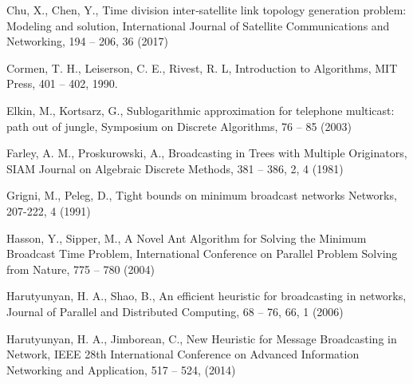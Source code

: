 






\begin{thebibliography}{}
%
%
Chu, X., Chen, Y.,
Time division inter‐satellite link topology generation problem: Modeling and solution,
International Journal of Satellite Communications and Networking, 194 -- 206, 36 (2017)

Cormen, T. H., Leiserson, C. E., Rivest, R. L,
Introduction to Algorithms, 
MIT Press, 401 -- 402, 1990. 

Elkin, M., Kortsarz, G.,
Sublogarithmic approximation for telephone multicast: path out of jungle,
Symposium on Discrete Algorithms, 76 -- 85 (2003)

Farley, A. M., Proskurowski, A.,
Broadcasting in Trees with Multiple Originators,
SIAM Journal on Algebraic Discrete Methods, 381 -- 386, 2, 4 (1981)

Grigni, M., Peleg, D.,
Tight bounds on minimum broadcast networks
Networks, 207-222, 4 (1991)

Hasson, Y., Sipper, M.,
A Novel Ant Algorithm for Solving the Minimum Broadcast Time Problem,
International Conference on Parallel Problem Solving from Nature, 775 -- 780 (2004)

Harutyunyan, H. A., Shao, B.,
An efficient heuristic for broadcasting in networks,
Journal of Parallel and Distributed Computing, 68 -- 76, 66, 1 (2006)

Harutyunyan, H. A., Jimborean, C.,
New Heuristic for Message Broadcasting in Network,
IEEE 28th International Conference on Advanced Information Networking and Application, 517 -- 524, (2014)


\end{thebibliography}
